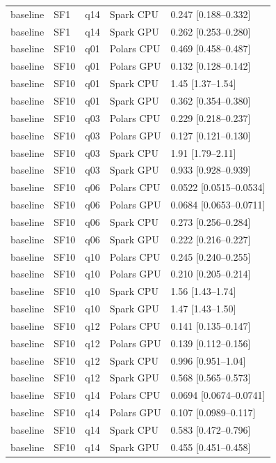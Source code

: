 \begin{longtable}{lllll}
baseline & SF1 & q14 & Spark CPU & 0.247 [0.188--0.332] \\
baseline & SF1 & q14 & Spark GPU & 0.262 [0.253--0.280] \\
baseline & SF10 & q01 & Polars CPU & 0.469 [0.458--0.487] \\
baseline & SF10 & q01 & Polars GPU & 0.132 [0.128--0.142] \\
baseline & SF10 & q01 & Spark CPU & 1.45 [1.37--1.54] \\
baseline & SF10 & q01 & Spark GPU & 0.362 [0.354--0.380] \\
baseline & SF10 & q03 & Polars CPU & 0.229 [0.218--0.237] \\
baseline & SF10 & q03 & Polars GPU & 0.127 [0.121--0.130] \\
baseline & SF10 & q03 & Spark CPU & 1.91 [1.79--2.11] \\
baseline & SF10 & q03 & Spark GPU & 0.933 [0.928--0.939] \\
baseline & SF10 & q06 & Polars CPU & 0.0522 [0.0515--0.0534] \\
baseline & SF10 & q06 & Polars GPU & 0.0684 [0.0653--0.0711] \\
baseline & SF10 & q06 & Spark CPU & 0.273 [0.256--0.284] \\
baseline & SF10 & q06 & Spark GPU & 0.222 [0.216--0.227] \\
baseline & SF10 & q10 & Polars CPU & 0.245 [0.240--0.255] \\
baseline & SF10 & q10 & Polars GPU & 0.210 [0.205--0.214] \\
baseline & SF10 & q10 & Spark CPU & 1.56 [1.43--1.74] \\
baseline & SF10 & q10 & Spark GPU & 1.47 [1.43--1.50] \\
baseline & SF10 & q12 & Polars CPU & 0.141 [0.135--0.147] \\
baseline & SF10 & q12 & Polars GPU & 0.139 [0.112--0.156] \\
baseline & SF10 & q12 & Spark CPU & 0.996 [0.951--1.04] \\
baseline & SF10 & q12 & Spark GPU & 0.568 [0.565--0.573] \\
baseline & SF10 & q14 & Polars CPU & 0.0694 [0.0674--0.0741] \\
baseline & SF10 & q14 & Polars GPU & 0.107 [0.0989--0.117] \\
baseline & SF10 & q14 & Spark CPU & 0.583 [0.472--0.796] \\
baseline & SF10 & q14 & Spark GPU & 0.455 [0.451--0.458] \\

\end{longtable}
